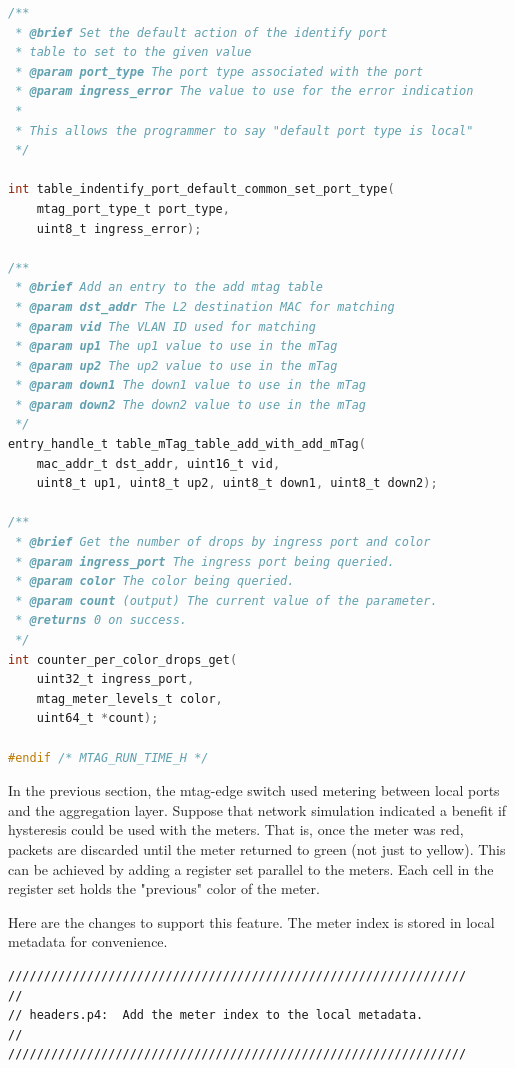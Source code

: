\documentclass[12pt]{article}
\begin{document}
\begin{itemize}
\begin{lstlisting}[language=C,frame=single]
/**
 * @brief Set the default action of the identify port
 * table to set to the given value
 * @param port_type The port type associated with the port
 * @param ingress_error The value to use for the error indication
 *
 * This allows the programmer to say "default port type is local"
 */

int table_indentify_port_default_common_set_port_type(
    mtag_port_type_t port_type,
    uint8_t ingress_error);

/**
 * @brief Add an entry to the add mtag table
 * @param dst_addr The L2 destination MAC for matching
 * @param vid The VLAN ID used for matching
 * @param up1 The up1 value to use in the mTag
 * @param up2 The up2 value to use in the mTag
 * @param down1 The down1 value to use in the mTag
 * @param down2 The down2 value to use in the mTag
 */
entry_handle_t table_mTag_table_add_with_add_mTag(
    mac_addr_t dst_addr, uint16_t vid,
    uint8_t up1, uint8_t up2, uint8_t down1, uint8_t down2);

/**
 * @brief Get the number of drops by ingress port and color
 * @param ingress_port The ingress port being queried.
 * @param color The color being queried.
 * @param count (output) The current value of the parameter.
 * @returns 0 on success.
 */
int counter_per_color_drops_get(
    uint32_t ingress_port,
    mtag_meter_levels_t color,
    uint64_t *count);

#endif /* MTAG_RUN_TIME_H */
\end{lstlisting}


In the previous section, the mtag-edge switch used metering between local 
ports and the aggregation layer. Suppose that network simulation indicated 
a benefit if hysteresis could be used with the meters. That is, once the meter 
was red, packets are discarded until the meter returned to green (not just 
to yellow).
This can be achieved by adding a register set parallel to the meters. Each 
cell in the register set holds the "previous" color of the meter. 

Here are the changes to support this feature. The meter index is stored in 
local metadata for convenience.

\begin{lstlisting}[keywords={},frame=single,escapechar=\@]
////////////////////////////////////////////////////////////////
//
// headers.p4:  Add the meter index to the local metadata.
//
////////////////////////////////////////////////////////////////


\end{lstlisting}
\end{itemize}
\end{document}

